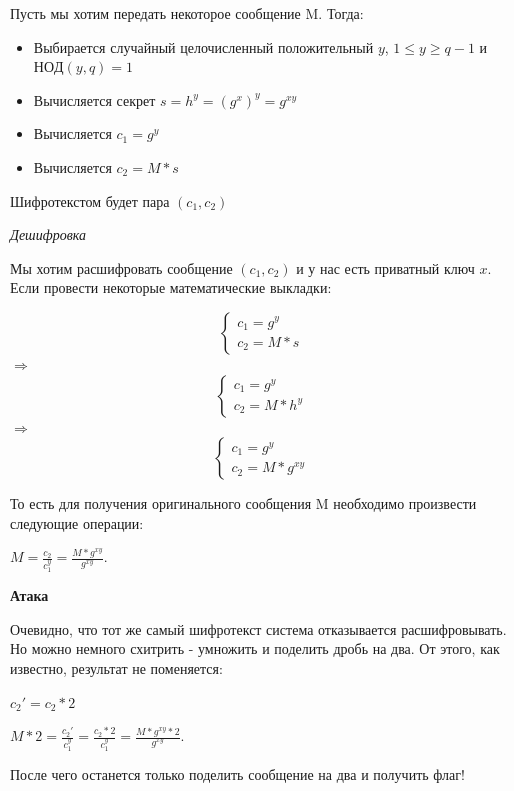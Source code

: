 \documentclass[idxtotoc,hyperref,openany,oneside]{files/crypto} %
\begin{document}
Пусть мы хотим передать некоторое сообщение M. Тогда:
\begin{itemize}
	\item Выбирается случайный целочисленный положительный $y$, $1 \leq y \geq q - 1$ и $НОД(y, q) = 1$
	\item Вычисляется секрет $s = h^y = (g^x)^y = g^{xy}$
	\item Вычисляется $c_1 = g^y$
	\item Вычисляется $c_2 = M * s$
\end{itemize}
Шифротекстом будет пара $(c_1, c_2)$

\textit{Дешифровка}

Мы хотим расшифровать сообщение $(c_1, c_2)$ и у нас есть приватный ключ $x$. Если провести некоторые математические выкладки:
\begin{center}
\begin{equation*}
 \begin{cases}
   c_1 = g^y 
   \\
   c_2 = M * s
 \end{cases}
\end{equation*}
$\Rightarrow$
\begin{equation*}
 \begin{cases}
   c_1 = g^y 
   \\
   c_2 = M * h^y
 \end{cases}
\end{equation*}
$\Rightarrow$
\begin{equation*}
 \begin{cases}
   c_1 = g^y 
   \\
   c_2 = M * g^{xy}
 \end{cases}
\end{equation*}
\end{center}
То есть для получения оригинального сообщения M необходимо произвести следующие операции:
\begin{center}
$M = \frac{c_2}{c_1^y} = \frac{M * g^{xy}}{g^{xy}}$.
\end{center}

\textbf{Атака}

Очевидно, что тот же самый шифротекст система отказывается расшифровывать. Но можно немного схитрить - умножить и поделить дробь на два. От этого, как известно, результат не поменяется:
\begin{center}
$c_2' = c_2 * 2$

$M * 2 = \frac{c_2'}{c_1^y} = \frac{c_2 * 2}{c_1^y} = \frac{M * g^{xy} * 2}{g^{xy}}$.
\end{center}
После чего останется только поделить сообщение на два и получить флаг!
\end{document}
